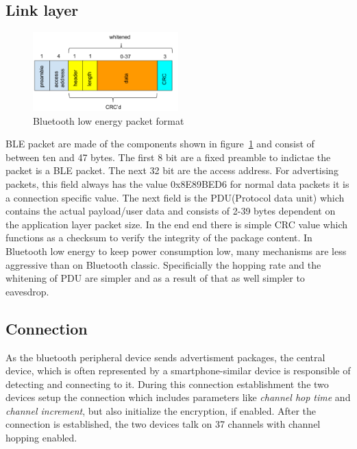 \documentclass[conference]{IEEEtran}
\begin{document}
\subsection{Link layer} \label{ssec:link}

\begin{figure}
  \centering
    \includegraphics[width=0.5\textwidth]{blepacketformat}
    \caption{Bluetooth low energy packet format \cite{imgsrc:packetformat} }
  \label{fig:packetformat}
\end{figure}

BLE packet are made of the components shown in figure~\ref{fig:packetformat} and consist of between ten and 47 bytes. The first 8 bit are a fixed preamble to indictae the packet is a BLE packet. The next 32 bit are the access address. For advertising packets, this field always has the value 0x8E89BED6 for normal data packets it is a connection specific value. The next field is the PDU(Protocol data unit) which contains the actual payload/user data and consists of 2-39 bytes dependent on the application layer packet size. In the end end there is simple CRC value which functions as a checksum to verify the integrity of the package content.
In Bluetooth low energy to keep power consumption low, many mechanisms are less aggressive than on Bluetooth classic. Specificially the hopping rate and the whitening of PDU are simpler and as a result of that as well simpler to eavesdrop.

\subsection{Connection} \label{ssec:con}

As the bluetooth peripheral device sends advertisment packages, the central device, which is often represented by a smartphone-similar device is responsible of detecting and connecting to it. During this connection establishment the two devices setup the connection which includes parameters like \emph{channel hop time} and \emph{channel increment}, but also initialize the encryption, if enabled. After the connection is established, the two devices talk on 37 channels with channel hopping enabled.
\end{document}
